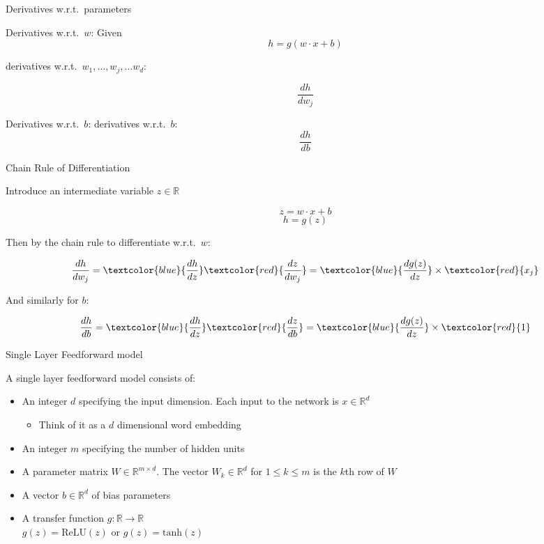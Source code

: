 \begin{frame}{Derivatives w.r.t.\ parameters}
\begin{block}{Derivatives w.r.t.\ $w$:}
Given 
\[ h = g(w \cdot x + b) \]

derivatives w.r.t.\ $w_1, \ldots, w_j, \ldots w_d$:

\[ \frac{dh}{dw_j} \]
\end{block}

\pause
\begin{block}{Derivatives w.r.t.\ $b$:}
derivatives w.r.t.\ $b$:
\[ \frac{dh}{db} \]
\end{block}
\end{frame}


\begin{frame}{Chain Rule of Differentiation}
\begin{block}{Introduce an intermediate variable $z \in \mathbb{R}$}

\[ z = w \cdot x + b \]
\[ h = g(z) \]

Then by the chain rule to differentiate w.r.t.\ $w$:

\[ \frac{dh}{dw_j} = \textcolor{blue}{\frac{dh}{dz}} \textcolor{red}{\frac{dz}{dw_j}} = \textcolor{blue}{\frac{dg(z)}{dz}} \times \textcolor{red}{x_j}\]

\pause
And similarly for $b$:

\[ \frac{dh}{db} = \textcolor{blue}{\frac{dh}{dz}} \textcolor{red}{\frac{dz}{db}}= \textcolor{blue}{\frac{dg(z)}{dz}} \times \textcolor{red}{1}\]

\end{block}
\end{frame}

\begin{frame}{Single Layer Feedforward model}
\begin{block}{A single layer feedforward model consists of:}
\begin{itemize}[<+->]
\item An integer $d$ specifying the input dimension. Each input to the network is $x \in \mathbb{R}^d$
  \begin{itemize}
  \item Think of it as a $d$ dimensional word embedding
  \end{itemize}
\item An integer $m$ specifying the number of hidden units
\item A parameter matrix $W \in \mathbb{R}^{m \times d}$. The vector $W_k \in \mathbb{R}^d$ for $1 \leq k \leq m$ is the $k$th row of $W$
\item A vector $b \in \mathbb{R}^d$ of bias parameters
\item A transfer function $g : \mathbb{R} \rightarrow \mathbb{R}$\\
$g(z) = \textrm{ReLU}(z)$ or $g(z) = \textrm{tanh}(z)$
\end{itemize}
\end{block}
\end{frame}

